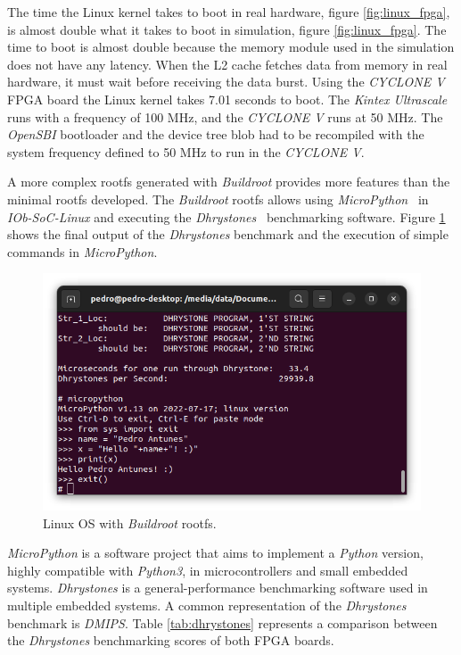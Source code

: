 The time the Linux kernel takes to boot in real hardware, figure \ref{fig:linux_fpga}, is almost double what it takes to boot in simulation, figure \ref{fig:linux_fpga}. The time to boot is almost double because the memory module used in the simulation does not have any latency. When the L2 cache fetches data from memory in real hardware, it must wait before receiving the data burst. Using the \textit{CYCLONE V} FPGA board the Linux kernel takes 7.01 seconds to boot. The \textit{Kintex Ultrascale} runs with a frequency of 100 MHz, and the \textit{CYCLONE V} runs at 50 MHz. The \textit{OpenSBI} bootloader and the device tree blob had to be recompiled with the system frequency defined to 50 MHz to run in the \textit{CYCLONE V}.

A more complex rootfs generated with \textit{Buildroot} provides more features than the minimal rootfs developed. The \textit{Buildroot} rootfs allows using \textit{MicroPython}~\cite{tollervey2017programming} in \textit{IOb-SoC-Linux} and executing the \textit{Dhrystones}~\cite{weicker1984dhrystone} benchmarking software. Figure \ref{fig:linux_buildroot_fpga} shows the final output of the \textit{Dhrystones} benchmark and the execution of simple commands in \textit{MicroPython}.

\begin{figure}[!ht]
    \centering
    \includegraphics[width=\linewidth]{../images/linux_buildroot_fpga.png}
    \caption{Linux OS with \textit{Buildroot} rootfs.}
    \label{fig:linux_buildroot_fpga}
\end{figure}

\textit{MicroPython} is a software project that aims to implement a \textit{Python} version, highly compatible with \textit{Python3}, in microcontrollers and small embedded systems. \textit{Dhrystones} is a general-performance benchmarking software used in multiple embedded systems. A common representation of the \textit{Dhrystones} benchmark is \textit{DMIPS}. Table \ref{tab:dhrystones} represents a comparison between the \textit{Dhrystones} benchmarking scores of both FPGA boards.

